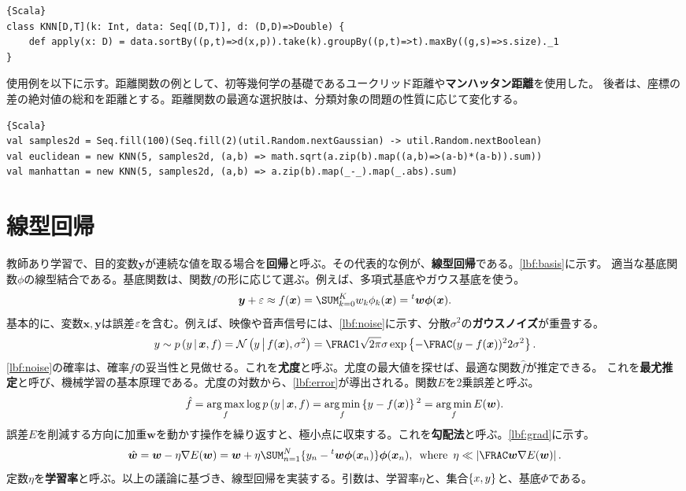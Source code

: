 \documentclass[10pt,a4paper]{book}
\begin{document}
\begin{Verbatim}{Scala}
class KNN[D,T](k: Int, data: Seq[(D,T)], d: (D,D)=>Double) {
	def apply(x: D) = data.sortBy((p,t)=>d(x,p)).take(k).groupBy((p,t)=>t).maxBy((g,s)=>s.size)._1
}
\end{Verbatim}

使用例を以下に示す。距離関数の例として、初等幾何学の基礎であるユークリッド距離や\textbf{マンハッタン距離}を使用した。
後者は、座標の差の絶対値の総和を距離とする。距離関数の最適な選択肢は、分類対象の問題の性質に応じて変化する。

\begin{Verbatim}{Scala}
val samples2d = Seq.fill(100)(Seq.fill(2)(util.Random.nextGaussian) -> util.Random.nextBoolean)
val euclidean = new KNN(5, samples2d, (a,b) => math.sqrt(a.zip(b).map((a,b)=>(a-b)*(a-b)).sum))
val manhattan = new KNN(5, samples2d, (a,b) => a.zip(b).map(_-_).map(_.abs).sum)
\end{Verbatim}

\section{線型回帰}

教師あり学習で、目的変数$\bm{y}$が連続な値を取る場合を\textbf{回帰}と呼ぶ。その代表的な例が、\textbf{線型回帰}である。\eqref{lbf:basis}に示す。
適当な基底関数$\phi$の線型結合である。基底関数は、関数$f$の形に応じて選ぶ。例えば、多項式基底やガウス基底を使う。
%
\begin{equation}
\label{eq:lbf:basis}
\bm{y} + \noise \approx f(\bm{x}) = \sum_{k=0}^K w_k \phi_k(\bm{x}) = \trans{\bm{w}}\bm{\phi}(\bm{x}).
\end{equation}
%
基本的に、変数$\bm{x},\bm{y}$は誤差$\varepsilon$を含む。例えば、映像や音声信号には、\eqref{lbf:noise}に示す、分散$\sigma^2$の\textbf{ガウスノイズ}が重畳する。
%
\begin{equation}
\label{eq:lbf:noise}
y \sim \prob{y}[\bm{x},f] =
\Nd{y}{f(\bm{x}),\sigma^2} =
\frac{1}{\sqrt{2\pi}\sigma}\exp\left\{-\frac{(y-f(\bm{x}))^2}{2\sigma^2}\right\}.
\end{equation}
%
\eqref{lbf:noise}の確率は、確率$f$の妥当性と見做せる。これを\textbf{尤度}と呼ぶ。尤度の最大値を探せば、最適な関数$\hat{f}$が推定できる。
これを\textbf{最尤推定}と呼び、機械学習の基本原理である。尤度の対数から、\eqref{lbf:error}が導出される。関数$E$を2乗誤差と呼ぶ。
%
\begin{equation}
\label{eq:lbf:error}
\hat{f} =
\argmax_f \log \prob{y}[\bm{x},f] =
\argmin_f \seq{y-f(\bm{x})}^2 =
\argmin_f E(\bm{w}).
\end{equation}
%
誤差$E$を削減する方向に加重$\bm{w}$を動かす操作を繰り返すと、極小点に収束する。これを\textbf{勾配法}と呼ぶ。\eqref{lbf:grad}に示す。
%
\begin{equation}
\label{eq:lbf:grad}
\hat{\bm{w}} = \bm{w} - \eta \nabla E(\bm{w}) = \bm{w} + \eta \sum_{n=1}^N \{y_n - \trans{\bm{w}} \bm{\phi}(\bm{x}_n)\} \bm{\phi}(\bm{x}_n),
\where
\eta \ll \abs{\frac{\bm{w}}{\nabla E(\bm{w})}}.
\end{equation}
%
定数$\eta$を\textbf{学習率}と呼ぶ。以上の議論に基づき、線型回帰を実装する。引数は、学習率$\eta$と、集合$\seqxy$と、基底$\Phi$である。
\end{document}
